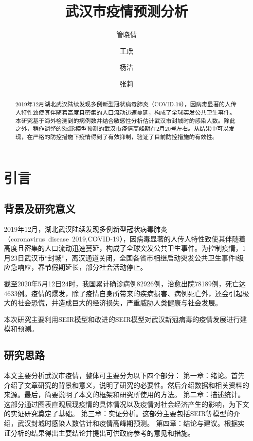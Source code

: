 \documentclass[12pt,hyperref,]{ctexart}
\title{武汉市疫情预测分析}
\author{管晓倩 \and 王瑶 \and 杨洁 \and 张莉}
\date{}
\begin{document}
\maketitle
\begin{abstract}
2019年12月湖北武汉陆续发现多例新型冠状病毒肺炎（COVID-19），因病毒显著的人传人特性致使其伴随着高度且密集的人口流动迅速蔓延，构成了全球突发公共卫生事件。本研究基于海外检测到的病例数并结合敏感性分析估计武汉市封城时的感染人数。除此之外，稍作调整的SEIR模型预测的武汉市疫情高峰期在2月20号左右。从结果中可以发现，在严格的防控措施下疫情得到了有效抑制，验证了目前防控措施的有效性。
\end{abstract}

\hypertarget{ux5f15ux8a00}{%
\section{引言}\label{ux5f15ux8a00}}

\hypertarget{ux80ccux666fux53caux7814ux7a76ux610fux4e49}{%
\subsection{背景及研究意义}\label{ux80ccux666fux53caux7814ux7a76ux610fux4e49}}

2019年12月，湖北武汉陆续发现多例新型冠状病毒肺炎（coronavirus~disease~2019,COVID-19），因病毒显著的人传人特性致使其伴随着高度且密集的人口流动迅速蔓延，构成了全球突发公共卫生事件。为控制疫情，1月23日武汉市``封城''，离汉通道关闭，全国各省市相继启动突发公共卫生事件Ⅰ级应急响应，春节假期延长，部分社会活动停止。

截至2020年5月12日24时，我国累计确诊病例82926例，治愈出院78189例，死亡达4633例。疫情的爆发，除了疫情自身所带来的疾病损害、病例死亡外，还会引起极大的社会恐慌，并造成巨大的经济损失，严重威胁人类健康与社会发展。

本次研究主要利用SEIR模型和改进的SEIR模型对武汉新冠病毒的疫情发展进行建模和预测。

\hypertarget{ux7814ux7a76ux601dux8def}{%
\subsection{研究思路}\label{ux7814ux7a76ux601dux8def}}

本文主要分析武汉市疫情，整体可主要分为以下四个部分：
第一章：绪论。首先介绍了文章研究的背景和意义，说明了研究的必要性。然后介绍数据和相关资料的来源。最后，简要说明了本文的框架和研究所使用的方法。
第二章：描述统计。这部分通过图表直观展现疫情的具体情况以及疫情对社会经济产生的影响，为下文的实证研究奠定了基础。
第三章：实证分析。这部分主要包括SEIR等模型的介绍，武汉封城时感染人数估计和疫情高峰期预测。
第四章：结论与建议。根据实证分析的结果得出主要结论并提出可供政府参考的意见和措施。
\end{document}
